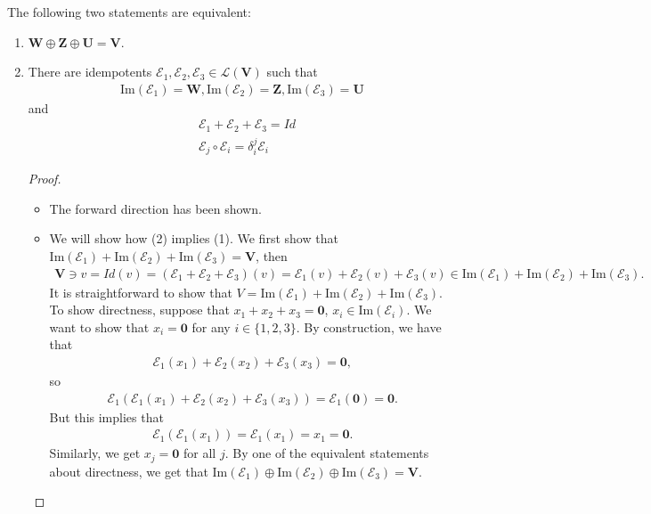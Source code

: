 \documentclass{book}
\theoremstyle{definition}
\newcommand{\V}{\mathbf{V}}
\newcommand{\W}{\mathbf{W}}
\newcommand{\Z}{\mathbf{Z}}
\newcommand{\U}{\mathbf{U}}
\newcommand{\lag}{\mathcal{L}}
\newcommand{\E}{\mathcal{E}}
\newcommand{\ima}{\text{Im}}
\begin{document}
The following two statements are equivalent:
\begin{enumerate}
	\item $\W \oplus \Z \oplus \U = \V$.
	
	\item There are idempotents $\E_1, \E_2, \E_3 \in \lag(\V)$ such that 
	\begin{align*}
	\ima(\E_1) = \W, \ima(\E_2) = \Z, \ima(\E_3) = \U
	\end{align*} 
	and
	\begin{align*}
	&\E_1 + \E_2 + \E_3 = Id\\
	&\E_j \circ \E_i = \delta^j_i \E_i
	\end{align*}
	
	\begin{proof}
		\begin{itemize}
			\item The forward direction has been shown.
			
			\item We will show how (2) implies (1). We first show that $\ima(\E_1) + \ima(\E_2) + \ima(\E_3) = \V$, then
			\begin{align*}
			\V \ni v = Id(v) = (\E_1 + \E_2 + \E_3)(v) = \E_1(v) + \E_2(v) + \E_3(v) \in \ima(\E_1) + \ima(\E_2) + \ima(\E_3).
			\end{align*}
			It is straightforward to show that $V = \ima(\E_1) + \ima(\E_2) + \ima(\E_3)$. To show directness, suppose that $x_1 + x_2 + x_3 = \mathbf{0}$, $x_i \in \ima(\E_i)$. We want to show that $x_i = \mathbf{0}$ for any $i \in \{1,2,3\}$. By construction, we have that
			\begin{align*}
			\E_1(x_1) + \E_2(x_2) + \E_3(x_3) = \mathbf{0},
			\end{align*}
			so
			\begin{align*}
			\E_1\left( \E_1(x_1) + \E_2(x_2) + \E_3(x_3) \right) = \E_1(\mathbf{0}) = \mathbf{0}.
			\end{align*}
			But this implies that 
			\begin{align*}
			\E_1(\E_1(x_1)) = \E_1(x_1) = x_1 = \mathbf{0}.
			\end{align*}
			Similarly, we get $x_j = \mathbf{0}$ for all $j$. By one of the equivalent statements about directness, we get that $\ima(\E_1) \oplus \ima(\E_2) \oplus \ima(\E_3) = \V$. 
		\end{itemize}
	\end{proof}
\end{enumerate}
\end{document}
